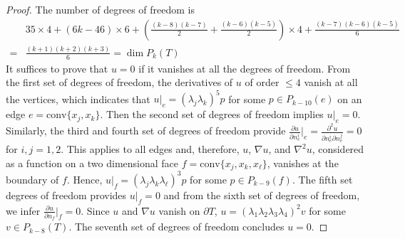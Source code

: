 \documentclass[a4paper]{amsart}
\numberwithin{equation}{section}
\theoremstyle{definition}
\theoremstyle{remark}
\numberwithin{theorem}{section}
\numberwithin{equation}{section}
\numberwithin{table}{section}
\numberwithin{figure}{section}
\begin{document}
\begin{proof}
	The number of degrees of freedom is
	\begin{align*}
		&35\times 4 + (6k-46)\times 6 + (\tfrac{(k-8)(k-7)}{2} +\tfrac{(k-6)(k-5)}{2})\times 4 + \tfrac{(k-7)(k-6)(k-5)}{6}\\
		= & \tfrac{(k+1)(k+2)(k+3)}{6} = \operatorname{dim}P_k(T)
	\end{align*}
	It suffices to prove that $u =0$ if it vanishes at all the degrees of freedom. From the first set of degrees of freedom, the derivatives of $u$ of order $\leq 4$ vanish at all the vertices, which indicates that $u|_e = (\lambda_j\lambda_k)^5p$ for some $p\in P_{k-10}(e)$ on an edge $e = \mathrm{conv}\{x_j,x_k\}$. Then the second set of degrees of freedom implies $u|_e = 0$. Similarly, the third and fourth set of degrees of freedom provide $\tfrac{\partial u}{\partial n_e^i}|_e = \tfrac{\partial^2u}{\partial n_e^i\partial n_e^j}=0$ for $i,j = 1,2$.
	This applies to all edges and,
	therefore, $u$, $\nabla u$, and $\nabla^2 u$, considered as a function on a two dimensional face $f = \mathrm{conv}\{x_j,x_k,x_\ell\}$, vanishes at the boundary of $f$. Hence,
	$u|_f = (\lambda_j\lambda_k\lambda_\ell)^3p$ for some $p\in P_{k-9}(f)$.
	The fifth set degrees of freedom provides $u|_f = 0$ and from the sixth set of degrees of freedom, we infer $\tfrac{\partial u}{\partial n_f}|_f=0$. Since $u$ and $\nabla u$ vanish on $\partial T$, $u = (\lambda_1\lambda_2\lambda_3\lambda_4)^2v$ for some $v\in P_{k-8}(T)$. The seventh set of degrees of freedom concludes $u = 0$.
\end{proof}
\printbibliography
\end{document}

